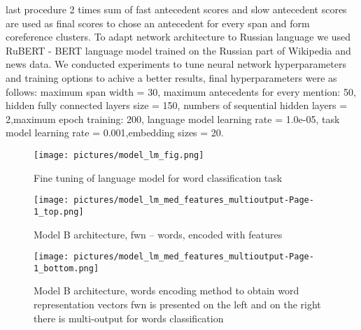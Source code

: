 \documentclass[a4paper,fleqn,longmktitle]{cas-dc}
\begin{document}
last procedure 2 times sum of fast antecedent scores and slow antecedent scores are used as final scores to chose an antecedent for every span and form coreference clusters.
To adapt network architecture to Russian language we used RuBERT - BERT language model trained on the Russian part of Wikipedia and news data. We conducted experiments to tune neural network hyperparameters and training options to achive a better results, final hyperparameters were as follows: maximum span width = 30, maximum antecedents for every mention: 50, hidden fully connected layers size = 150, numbers of sequential hidden layers = 2,maximum epoch training: 200, language model learning rate = 1.0e-05, task model learning rate = 0.001,embedding sizes = 20.
  
\begin{figure}
    \centering
    \texttt{[image: pictures/model\_lm\_fig.png]}
    \caption{Fine tuning of language model for word classification task}
    \label{fig:ner_finetune}
\end{figure}

\begin{figure}
    \centering
    \texttt{[image: pictures/model\_lm\_med\_features\_multioutput-Page-1\_top.png]}
    \caption{Model B architecture, fwn -- words, encoded with features}
    \label{fig:modelB_output}
\end{figure}

\begin{figure}
    \centering
    \texttt{[image: pictures/model\_lm\_med\_features\_multioutput-Page-1\_bottom.png]}
    \caption{Model B architecture, words encoding method to obtain word representation vectors fwn is presented on the left and on the right there is multi-output for words classification}
    \label{fig:modelB_encoding}
\end{figure}



\end{document}
